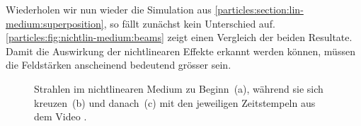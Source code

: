 Wiederholen wir nun wieder die Simulation aus \autoref{particles:section:lin-medium:superposition}, so fällt zunächst kein Unterschied auf.
\autoref{particles:fig:nichtlin-medium:beams} zeigt einen Vergleich der beiden Resultate.
Damit die Auswirkung der nichtlinearen Effekte erkannt werden können, müssen die Feldstärken anscheinend bedeutend grösser sein.
\begin{figure}
    \centering
    \label{particles:fig:nichtlin-medium:beams-1}\hfill
    \label{particles:fig:nichtlin-medium:beams-2}\hfill
    \label{particles:fig:nichtlin-medium:beams-3}
    \caption{Strahlen im nichtlinearen Medium zu Beginn~(a), während sie sich kreuzen~(b) und danach~(c) mit den jeweiligen Zeitstempeln aus dem Video \cite{particles:video-beams-nonlin}.}\label{particles:fig:nichtlin-medium:beams}
\end{figure}


